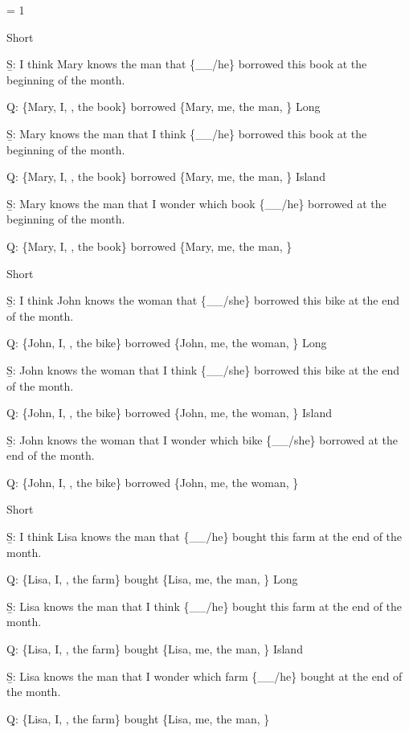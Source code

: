 \excnt = 1

\pex 
\a Short\par\nobreak
\beginsubsub 
\b{S:} I think Mary knows the man that \{\_\_/he\} borrowed this book at the beginning of the month.\par\nobreak
\b{Q:} \{Mary, I, , the book\} borrowed \{Mary, me, the man, \}
\endsubsub
\a Long\par\nobreak
\beginsubsub
\b{S:} Mary knows the man that I think \{\_\_/he\} borrowed this book at the beginning of the month.\par\nobreak
\b{Q:} \{Mary, I, , the book\} borrowed \{Mary, me, the man, \}
\endsubsub
\a Island\par\nobreak
\beginsubsub
\b{S:} Mary knows the man that I wonder which book \{\_\_/he\} borrowed at the beginning of the month.\par\nobreak
\b{Q:} \{Mary, I, , the book\} borrowed \{Mary, me, the man, \}
\endsubsub
\xe

\pex 
\a Short\par\nobreak
\beginsubsub 
\b{S:} I think John knows the woman that \{\_\_/she\} borrowed this bike at the end of the month.\par\nobreak
\b{Q:} \{John, I, , the bike\} borrowed \{John, me, the woman, \}
\endsubsub
\a Long\par\nobreak
\beginsubsub
\b{S:} John knows the woman that I think \{\_\_/she\} borrowed this bike at the end of the month.\par\nobreak
\b{Q:} \{John, I, , the bike\} borrowed \{John, me, the woman, \}
\endsubsub
\a Island\par\nobreak
\beginsubsub
\b{S:} John knows the woman that I wonder which bike \{\_\_/she\} borrowed at the end of the month.\par\nobreak
\b{Q:} \{John, I, , the bike\} borrowed \{John, me, the woman, \}
\endsubsub
\xe

\pex 
\a Short\par\nobreak
\beginsubsub 
\b{S:} I think Lisa knows the man that \{\_\_/he\} bought this farm at the end of the month.\par\nobreak
\b{Q:} \{Lisa, I, , the farm\} bought \{Lisa, me, the man, \}
\endsubsub
\a Long\par\nobreak
\beginsubsub
\b{S:} Lisa knows the man that I think \{\_\_/he\} bought this farm at the end of the month.\par\nobreak
\b{Q:} \{Lisa, I, , the farm\} bought \{Lisa, me, the man, \}
\endsubsub
\a Island\par\nobreak
\beginsubsub
\b{S:} Lisa knows the man that I wonder which farm \{\_\_/he\} bought at the end of the month.\par\nobreak
\b{Q:} \{Lisa, I, , the farm\} bought \{Lisa, me, the man, \}
\endsubsub
\xe

